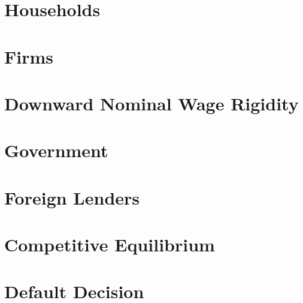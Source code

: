 \section{Households}


\section{Firms}


\section{Downward Nominal Wage Rigidity}


\section{Government}


\section{Foreign Lenders}


\section{Competitive Equilibrium}


\section{Default Decision}
\label{sec: model-default-decision}


